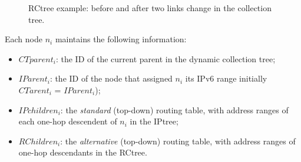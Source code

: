 \begin{figure}[!h]
\begin{center}
            \caption{RCtree example: before
            and after two links change in the collection tree.}\label{fig:layers}
\end{center}
\end{figure}

Each node $n_i$ maintains the following information:
\begin{itemize}
  \item $CTparent_i$: the ID of the current parent in the dynamic
  collection tree;
  \item $IParent_i$: the ID of the node that assigned $n_i$ its IPv6 range
initially $CTarent_i$ = $IParent_i$);
  \item $IPchildren_i$: the \textit{standard} (top-down) routing table, with
  address ranges of each one-hop descendent of $n_i$ in the IPtree;
  \item $RChildren_i$: the \textit{alternative} (top-down) routing table, with
  address ranges of one-hop descendants in the RCtree.
\end{itemize}

